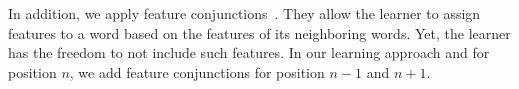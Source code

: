 In addition, we apply \glspl{feature conjunction}~\citep{mccallum2002mallet}.
They allow the learner to assign features to a word based on the features of its neighboring words.
Yet, the learner has the freedom to not include such features.
In our learning approach and for position $n$, we add \glspl{feature conjunction} for position $n-1$ and $n+1$.

